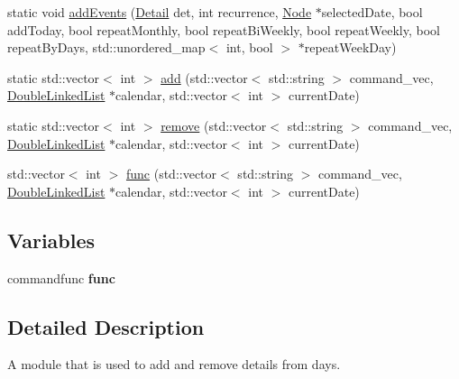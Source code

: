 \begin{DoxyCompactItemize}
\item 
static void \hyperlink{group__CMD__DETAIL_ga80f84e2810faa505dc48fcc8832ead6c}{add\-Events} (\hyperlink{classDetail}{Detail} det, int recurrence, \hyperlink{classNode}{Node} $\ast$selected\-Date, bool add\-Today, bool repeat\-Monthly, bool repeat\-Bi\-Weekly, bool repeat\-Weekly, bool repeat\-By\-Days, std\-::unordered\-\_\-map$<$ int, bool $>$ $\ast$repeat\-Week\-Day)
\item 
static std\-::vector$<$ int $>$ \hyperlink{group__CMD__DETAIL_ga0b49c27571f2cb14fe28d9267ac5d1d0}{add} (std\-::vector$<$ std\-::string $>$ command\-\_\-vec, \hyperlink{classDoubleLinkedList}{Double\-Linked\-List} $\ast$calendar, std\-::vector$<$ int $>$ current\-Date)
\item 
static std\-::vector$<$ int $>$ \hyperlink{group__CMD__DETAIL_gab77ee0d754003aa6a1f3c0aa301962b8}{remove} (std\-::vector$<$ std\-::string $>$ command\-\_\-vec, \hyperlink{classDoubleLinkedList}{Double\-Linked\-List} $\ast$calendar, std\-::vector$<$ int $>$ current\-Date)
\item 
std\-::vector$<$ int $>$ \hyperlink{group__CMD__DETAIL_ga220b66828663d5311ad270969b6155ed}{func} (std\-::vector$<$ std\-::string $>$ command\-\_\-vec, \hyperlink{classDoubleLinkedList}{Double\-Linked\-List} $\ast$calendar, std\-::vector$<$ int $>$ current\-Date)
\end{DoxyCompactItemize}
\subsection*{Variables}
\begin{DoxyCompactItemize}
\item 
\hypertarget{namespaceCMD__DETAIL_ab2dc55bd1c86c91dac70e550bde1a236}{commandfunc {\bfseries func}}\label{namespaceCMD__DETAIL_ab2dc55bd1c86c91dac70e550bde1a236}

\end{DoxyCompactItemize}


\subsection{Detailed Description}
A module that is used to add and remove details from days. 